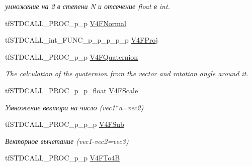 \begin{DoxyCompactItemize}
\begin{DoxyCompactList}\small\item\em умножение на 2 в степени N и отсечение float в int. \end{DoxyCompactList}\item 
tf\-S\-T\-D\-C\-A\-L\-L\-\_\-\-P\-R\-O\-C\-\_\-p\-\_\-p \hyperlink{structs_functions_vector_c_p_u_a4454814154f2fb9bb2f339907798d082}{V4\-F\-Normal}
\item 
tf\-S\-T\-D\-C\-A\-L\-L\-\_\-int\-\_\-\-F\-U\-N\-C\-\_\-p\-\_\-p\-\_\-p\-\_\-p\-\_\-p \hyperlink{structs_functions_vector_c_p_u_a893d79c07d866ae6afbcf96c22158f85}{V4\-F\-Proj}
\item 
\hypertarget{structs_functions_vector_c_p_u_a9aaec7bdfa3341bebdb9b0ab32b2f343}{tf\-S\-T\-D\-C\-A\-L\-L\-\_\-\-P\-R\-O\-C\-\_\-p\-\_\-p \hyperlink{structs_functions_vector_c_p_u_a9aaec7bdfa3341bebdb9b0ab32b2f343}{V4\-F\-Quaternion}}\label{structs_functions_vector_c_p_u_a9aaec7bdfa3341bebdb9b0ab32b2f343}

\begin{DoxyCompactList}\small\item\em The calculation of the quaternion from the vector and rotation angle around it. \end{DoxyCompactList}\item 
\hypertarget{structs_functions_vector_c_p_u_af2fc390222c630527066e25cecb1d7b3}{tf\-S\-T\-D\-C\-A\-L\-L\-\_\-\-P\-R\-O\-C\-\_\-p\-\_\-p\-\_\-float \hyperlink{structs_functions_vector_c_p_u_af2fc390222c630527066e25cecb1d7b3}{V4\-F\-Scale}}\label{structs_functions_vector_c_p_u_af2fc390222c630527066e25cecb1d7b3}

\begin{DoxyCompactList}\small\item\em Умножение вектора на число (vec1$\ast$a=vec2) \end{DoxyCompactList}\item 
\hypertarget{structs_functions_vector_c_p_u_aa6f781ffe5c099aa2c48e0b6ba735d9a}{tf\-S\-T\-D\-C\-A\-L\-L\-\_\-\-P\-R\-O\-C\-\_\-p\-\_\-p\-\_\-p \hyperlink{structs_functions_vector_c_p_u_aa6f781ffe5c099aa2c48e0b6ba735d9a}{V4\-F\-Sub}}\label{structs_functions_vector_c_p_u_aa6f781ffe5c099aa2c48e0b6ba735d9a}

\begin{DoxyCompactList}\small\item\em Векторное вычетание (vec1-\/vec2=vec3) \end{DoxyCompactList}\item 
\hypertarget{structs_functions_vector_c_p_u_a0adb2d5b5433226f56731f5f7e4c0046}{tf\-S\-T\-D\-C\-A\-L\-L\-\_\-\-P\-R\-O\-C\-\_\-p\-\_\-p \hyperlink{structs_functions_vector_c_p_u_a0adb2d5b5433226f56731f5f7e4c0046}{V4\-F\-To4\-B}}\label{structs_functions_vector_c_p_u_a0adb2d5b5433226f56731f5f7e4c0046}


\end{DoxyCompactItemize}
